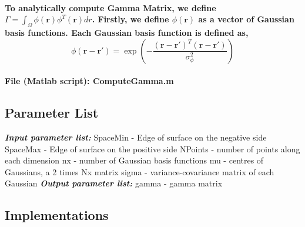 \documentclass[a4paper, 12pt, english]{article}
\begin{document}
\paragraph{To analytically compute Gamma Matrix, we define
$\Gamma=\int_{\Omega}\phi(\boldsymbol{r})\phi^{T}(\boldsymbol{r})dr$.
Firstly, we define $\phi(\boldsymbol{r})$ as a vector of Gaussian basis functions.
Each Gaussian basis function is defined as,
$$\phi(\boldsymbol{r}-\boldsymbol{r}\prime)=\exp{\left(-\frac{(\boldsymbol{r}-\boldsymbol{r}\prime)^{T}(\boldsymbol{r}-\boldsymbol{r}\prime)}{\sigma_{\phi}^{2}}\right)}$$}

\paragraph{File (Matlab script): ComputeGamma.m}

\subsection{Parameter List}
\textbf{\textit{Input parameter list:}}\newline
SpaceMin - Edge of surface on the negative side\newline
SpaceMax - Edge of surface on the positive side\newline
NPoints - number of points along each dimension\newline
nx - number of Gaussian basis functions\newline
mu - centres of Gaussians, a 2 times Nx matrix\newline
sigma - variance-covariance matrix of each Gaussian\newline
\textbf{\textit{Output parameter list:}}\newline
gamma - gamma matrix

\subsection{Implementations}
\end{document}

